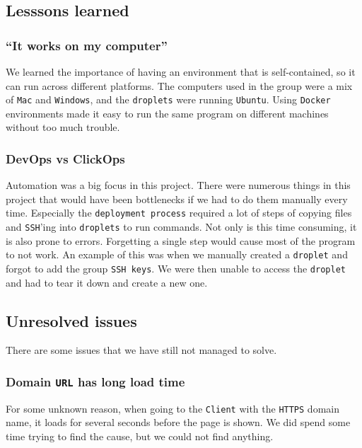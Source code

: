 \subsection{Lesssons learned}

\subsubsection{``It works on my computer''}

We learned the importance of having an environment that is 
self-contained, so it can run across different platforms.
The computers used in the group were a mix of \texttt{Mac} and \texttt{Windows},
and the \texttt{droplets} were running \texttt{Ubuntu}. 
Using \texttt{Docker} environments made it easy to run the same program
on different machines without too much trouble.

\subsubsection{DevOps vs ClickOps}

Automation was a big focus in this project.
There were numerous things in this project that 
would have been bottlenecks if we had to do them manually every time.
Especially the \texttt{deployment process} required a lot of steps
of copying files and \texttt{SSH}'ing into \texttt{droplets} to run commands.
Not only is this time consuming, it is also prone to errors.
Forgetting a single step would cause most of the program to not work.
An example of this was when we manually created a \texttt{droplet} and forgot to add the 
group \texttt{SSH keys}. We were then unable to access the \texttt{droplet} and had to 
tear it down and create a new one.

\subsection{Unresolved issues}

There are some issues that we have still not managed to solve.

\subsubsection{Domain \texttt{URL} has long load time}

For some unknown reason, when going to the \texttt{Client} with the \texttt{HTTPS} domain name, 
it loads for several seconds before the page is shown.
We did spend some time trying to find the cause,
but we could not find anything.

